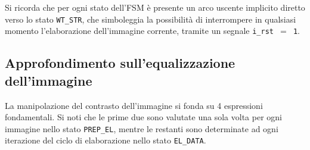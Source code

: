 \documentclass{article}
\begin{document}
\vspace{0,2cm}

Si ricorda che per ogni stato dell'FSM è presente un arco uscente implicito diretto verso lo stato \texttt{WT\_STR}, che simboleggia la possibilità di interrompere in qualsiasi momento l'elaborazione dell'immagine corrente, tramite un segnale \texttt{i\_rst $=$ 1}.
\vspace{0,2cm}

\subsection{Approfondimento sull'equalizzazione dell'immagine} %
\label{sec:appr}
La manipolazione del contrasto dell’immagine si fonda su 4 espressioni fondamentali. Si noti che le prime due sono valutate una sola volta per ogni immagine nello stato \texttt{PREP\_EL}, mentre le restanti sono determinate ad ogni iterazione del ciclo di elaborazione nello stato \texttt{EL\_DATA}.
\end{document}
